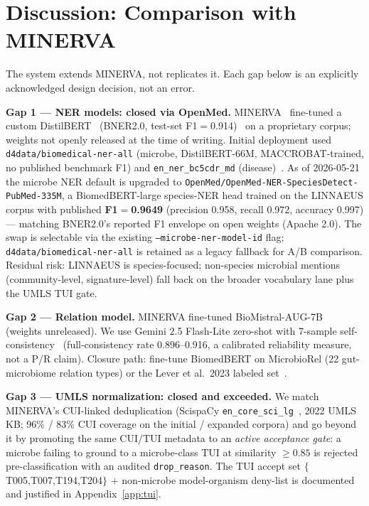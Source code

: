 \documentclass[10pt,twocolumn,letterpaper]{article}
\begin{document}
\section{Discussion: Comparison with MINERVA}

The system extends MINERVA, not replicates it. Each gap below is an
explicitly acknowledged design decision, not an error.

\noindent\textbf{Gap 1 --- NER models: closed via OpenMed.} MINERVA~\cite{langarica2025minerva}
fine-tuned a custom DistilBERT~\cite{sanh2019distilbert} (BNER2.0,
test-set F1$=$0.914)~\cite{li2019bner20} on a proprietary corpus; weights
not openly released at the time of writing. Initial deployment used
\texttt{d4data/biomedical-ner-all} (microbe, DistilBERT-66M,
MACCROBAT-trained, no published benchmark F1) and \texttt{en\_ner\_bc5cdr\_md}
(disease)~\cite{neumann2019scispacy,li2016bc5cdr}. As of 2026-05-21 the
microbe NER default is upgraded to
\texttt{OpenMed/OpenMed-NER-SpeciesDetect-PubMed-335M}, a BiomedBERT-large
species-NER head trained on the LINNAEUS corpus with published
\textbf{F1$=$0.9649} (precision 0.958, recall 0.972, accuracy 0.997) ---
matching BNER2.0's reported F1 envelope on open weights (Apache 2.0). The
swap is selectable via the existing \texttt{--microbe-ner-model-id} flag;
\texttt{d4data/biomedical-ner-all} is retained as a legacy fallback for
A/B comparison. Residual risk: LINNAEUS is species-focused; non-species
microbial mentions (community-level, signature-level) fall back on the
broader vocabulary lane plus the UMLS TUI gate.

\noindent\textbf{Gap 2 --- Relation model.} MINERVA fine-tuned
BioMistral-AUG-7B~\cite{labrak2024biomistral} (weights unreleased). We use
Gemini 2.5 Flash-Lite zero-shot with 7-sample
self-consistency~\cite{wang2023selfconsistency} (full-consistency rate
0.896--0.916, a calibrated reliability measure, not a P/R claim). Closure
path: fine-tune BiomedBERT on MicrobioRel (22 gut-microbiome relation
types) or the Lever et al.\ 2023 labeled set~\cite{lever2023microbe}.

\noindent\textbf{Gap 3 --- UMLS normalization: closed and exceeded.} We
match MINERVA's CUI-linked deduplication (ScispaCy
\texttt{en\_core\_sci\_lg}~\cite{neumann2019scispacy}, 2022
UMLS~\cite{bodenreider2004umls} KB; 96\% / 83\% CUI coverage on the initial
/ expanded corpora) and go beyond it by promoting the same CUI/TUI metadata
to an \emph{active acceptance gate}: a microbe failing to ground to a
microbe-class TUI at similarity $\geq 0.85$ is rejected pre-classification
with an audited \texttt{drop\_reason}. The TUI accept set
$\{$T005,T007,T194,T204$\}$ + non-microbe model-organism deny-list is
documented and justified in Appendix~\ref{app:tui}.
\end{document}
